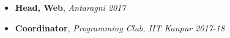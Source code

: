 
\begin{itemize}
\item \textbf{Head, Web}, \emph{Antaragni 2017}
\item \textbf{Coordinator}, \emph{Programming Club, IIT Kanpur 2017-18}

\end{itemize}
\vspace{-2mm}
